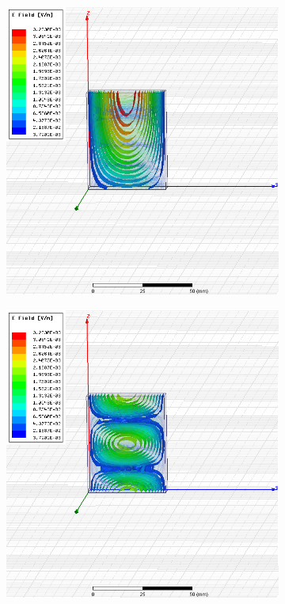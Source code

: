 \documentclass[12pt,a4paper]{article}
\begin{document}
\begin{figure}
  \centering
  \begin{subfigure}[b]{0.49\textwidth}
    \includegraphics[width=\textwidth]{./HFSSDesign1/4ghz.png}
    \label{fig:1_4ghz}
  \end{subfigure}
  \begin{subfigure}[b]{0.49\textwidth}
    \includegraphics[width=\textwidth]{./HFSSDesign1/7ghz.png}

\end{subfigure}
\end{figure}
\end{document}
